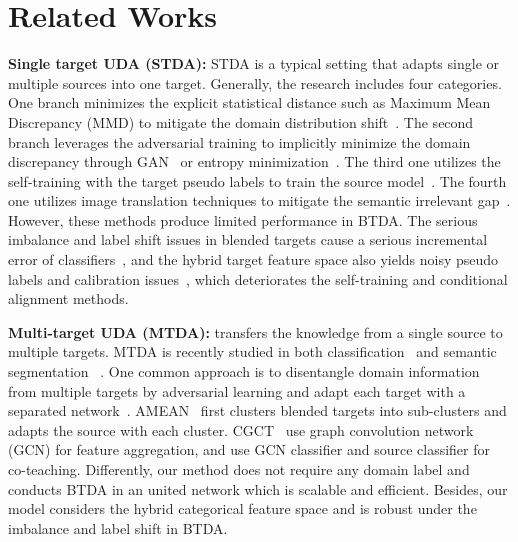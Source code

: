 \documentclass[letterpaper]{article} \usepackage{aaai23}  \usepackage{times}  \usepackage{helvet}  \usepackage{courier}  \usepackage[hyphens]{url}  \usepackage{graphicx} \urlstyle{rm} \def\UrlFont{\rm}  \usepackage{natbib}  \usepackage{caption} \frenchspacing  \setlength{\pdfpagewidth}{8.5in}  \setlength{\pdfpageheight}{11in}
\begin{document}
\section{Related Works} 
\noindent\textbf{Single target UDA (STDA):} STDA is a typical setting that adapts  single or multiple sources into one target. Generally, the research includes four categories. One branch minimizes the explicit statistical distance such as Maximum Mean Discrepancy (MMD) to mitigate the domain distribution shift~\cite{long2015learning,long2017deep,officehome,tzeng2014deep,shen2018wasserstein,lee2019sliced,xu2019wasserstein,montesuma2021wasserstein}. The second branch leverages the adversarial training to implicitly minimize the domain discrepancy through GAN~\cite{ganin2015unsupervised,tzeng2017adversarial,zhang2019bridging} or entropy minimization~\cite{pan2020unsupervised,vu2019advent}. The third one utilizes the self-training with the target pseudo labels to train the source model~\cite{liu2021cycle,french2017self}. The fourth one utilizes image translation techniques to mitigate the semantic irrelevant gap~\cite{sankaranarayanan2018generate,roy2021trigan,kim2020learning,yang2020label}. However, these methods produce limited performance in BTDA. The serious imbalance and label shift issues in blended targets cause a serious incremental error of classifiers~\cite{wu2019domain}, and the hybrid target feature space also yields noisy pseudo labels and calibration issues~\cite{mei2020instance}, which deteriorates the self-training and conditional alignment methods. 

\noindent\textbf{Multi-target UDA (MTDA):} transfers the knowledge from a single source to multiple targets. MTDA is recently studied in both classification~\cite{gholami2020unsupervised,nguyen2021unsupervised,chen2019blending,roy2021curriculum,yang2020heterogeneous} and semantic segmentation ~\cite{saporta2021multi,isobe2021multi}. One common approach is to disentangle domain information from multiple targets by adversarial learning and adapt each target with a separated network~\cite{saporta2021multi,gholami2020unsupervised}. AMEAN~\cite{chen2019blending} first clusters blended targets into sub-clusters and adapts the source with each cluster. CGCT~\cite{roy2021curriculum} use graph convolution network (GCN) for feature aggregation, and use GCN classifier and source classifier for co-teaching. Differently, our method does not require any domain label and conducts BTDA in an united network which is scalable and efficient. Besides, our model considers the hybrid categorical feature space and is robust under the imbalance and label shift in BTDA.
\end{document}

